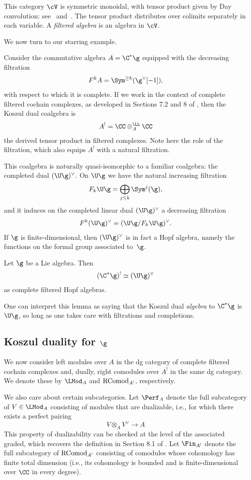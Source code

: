 \documentclass[10pt]{amsart}
\begin{document}
This category $\cV$ is symmetric monoidal, with tensor product given by Day convolution: see~\cite{CosYang} and~\cite{GwiPav}. The tensor product distributes over colimits separately in each variable. 
A {\it filtered algebra} is an algebra in $\cV$.

We now turn to our starring example.

Consider the commutative algebra $A = \C^*\g$
equipped with the decreasing filtration
\[
F^k A = \Sym^{\geq k}(\g^\vee[-1]),
\]
with respect to which it is complete.
If we work in the context of complete filtered cochain complexes, 
as developed in Sections 7.2 and 8 of \cite{CosYang},
then the Koszul dual coalgebra is
\[
A^! =\CC \otimes_A^\LL \CC
\]
the derived tensor product in filtered complexes.
Note here the role of the filtration,
which also equips $A^!$ with a natural filtration.

This coalgebra is naturally quasi-isomorphic to a familiar coalgebra:
the completed dual $(\U\g)^\vee$.
On $\U\g$ we have  the natural increasing filtration 
\[
F_k \U\g = \bigoplus_{j \leq k} \Sym^j(\g),
\]
and it induces on the completed linear dual $(\U\g)^\vee$ a decreasing filtration 
\[
F^k (\U\g)^\vee = (\U\g/F_k \U\g)^\vee.
\]
If $\g$ is finite-dimensional,
then $(\U\g)^\vee$ is in fact a Hopf algebra,
namely the functions on the formal group associated to~$\g$.

\begin{lmm}
Let $\g$ be a Lie algebra. Then 
\[
(\C^*\g)^! \simeq (\U\g)^\vee
\]
as complete filtered Hopf algebras.
\end{lmm}

One can interpret this lemma as saying that the Koszul dual {\em algebra} to $\C^*\g$ is $\U\g$,
so long as one takes care with filtrations and completions.

\subsection{Koszul duality for $\g$}

\def\RComod{{\rm RComod}}

We now consider left modules over $A$ in the dg category of complete filtered cochain complexes
and, dually, right comodules over $A^!$ in the same dg category.
We denote these by $\LMod_A$ and $\RComod_{A^!}$, respectively.

We also care about certain subcategories.
Let $\Perf_A$ denote the full subcategory of $V\in \LMod_A$ consisting of modules that are dualizable, i.e., for which there exists a perfect pairing
\[
V\otimes_A V^\vee \longrightarrow A
\]
This property of dualizability can be checked at the level of the associated graded,
which recovers the definition in Section 8.1 of \cite{CosYang}.
Let $\Fin_{A^!}$ denote the full subcategory of $\RComod_{A^!}$ consisting of comodules whose cohomology has finite total dimension
(i.e., its cohomology is bounded and is finite-dimensional over $\CC$ in every degree).
\end{document}
